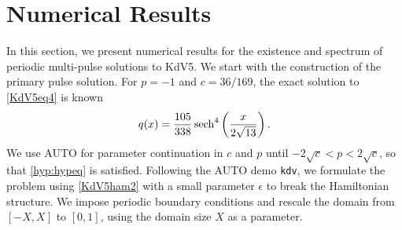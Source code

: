 \documentclass[10pt,reqno]{amsart}
\theoremstyle{plain}
\theoremstyle{definition}
\theoremstyle{remark}
\numberwithin{theorem}{section}
\numberwithin{equation}{section}
\begin{document}
\section{Numerical Results}\label{sec:numerics}

In this section, we present numerical results for the existence and spectrum of periodic multi-pulse solutions to KdV5. We start with the construction of the primary pulse solution. For $p = -1$ and $c = 36/169$, the exact solution to \cref{KdV5eq4} is known \cite[(3)]{Pelinovsky2007}
\begin{equation}\label{KdV5exactsol}
q(x) = \frac{105}{338}\mathop\mathrm{sech}\nolimits^4\left(\frac{x}{2\sqrt{13}} \right).
\end{equation}
We use AUTO for parameter continuation in $c$ and $p$ until $-2 \sqrt{c} < p < 2 \sqrt{c}$, so that \cref{hyp:hypeq} is satisfied. Following the AUTO demo \texttt{kdv}, we formulate the problem using \cref{KdV5ham2} with a small parameter $\epsilon$ to break the Hamiltonian structure. We impose periodic boundary conditions and rescale the domain from $[-X, X]$ to $[0, 1]$, using the domain size $X$ as a parameter. 
\end{document}
